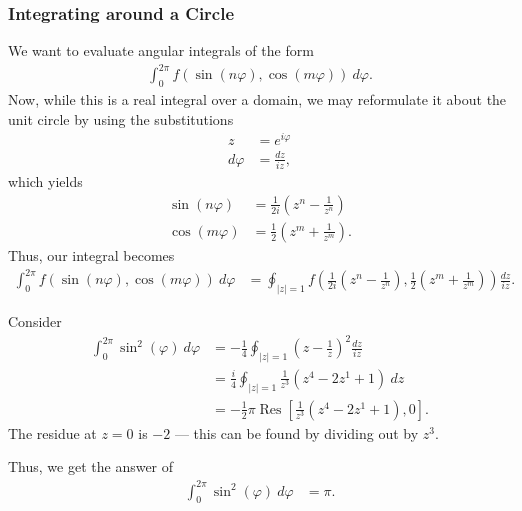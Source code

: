 \documentclass[10pt]{mypackage}
\DeclareMathOperator{\res}{Res}
\begin{document}
  \subsubsection{Integrating around a Circle}%
  We want to evaluate angular integrals of the form
  \begin{align*}
    \int_{0}^{2\pi} f\left( \sin\left( n\varphi \right),\cos\left( m\varphi \right) \right)\:d\varphi.
  \end{align*}
  Now, while this is a real integral over a domain, we may reformulate it about the unit circle by using the substitutions
  \begin{align*}
    z &= e^{i\varphi}\\
    d\varphi &= \frac{dz}{iz},
  \end{align*}
  which yields
  \begin{align*}
    \sin\left( n\varphi \right) &= \frac{1}{2i} \left( z^n - \frac{1}{z^n} \right)\\
    \cos\left( m\varphi \right) &= \frac{1}{2}\left( z^m + \frac{1}{z^m} \right).
  \end{align*}
  Thus, our integral becomes
  \begin{align*}
    \int_{0}^{2\pi} f\left( \sin\left( n\varphi \right),\cos\left( m\varphi \right) \right)\:d\varphi &= \oint_{|z|=1} f\left( \frac{1}{2i}\left( z^n - \frac{1}{z^n} \right), \frac{1}{2}\left( z^m + \frac{1}{z^m} \right) \right) \frac{dz}{iz}.
  \end{align*}
  \begin{example}
    Consider
    \begin{align*}
      \int_{0}^{2\pi} \sin^2\left( \varphi \right)\:d\varphi &= -\frac{1}{4}\oint_{|z|=1}\left( z-\frac{1}{z} \right)^2 \frac{dz}{iz}\\
                                                             &= \frac{i}{4}\oint_{|z|=1} \frac{1}{z^3}\left( z^4 -2z^1 + 1 \right)\:dz\\
                                                             &= -\frac{1}{2}\pi\res\left[ \frac{1}{z^3}\left( z^4 - 2z^1 + 1 \right),0 \right].
    \end{align*}
    The residue at $z = 0$ is $-2$ --- this can be found by dividing out by $z^3$.\newline

    Thus, we get the answer of
    \begin{align*}
      \int_{0}^{2\pi} \sin^2\left( \varphi \right)\:d\varphi &= \pi.
    \end{align*}
  \end{example}
\end{document}
